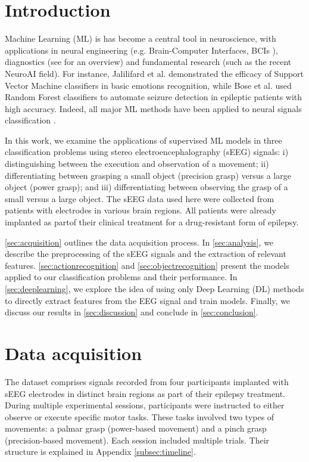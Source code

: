 \documentclass[10pt,conference,compsocconf]{IEEEtran}
\begin{document}
\section{Introduction}
Machine Learning (ML) is has become a central tool in neuroscience, with applications in neural engineering (e.g. Brain-Computer Interfaces, BCIs \cite{eegforbci}), diagnostics (see \cite{VIEIRA201758} for an overview) and fundamental research (such as the recent NeuroAI field). For instance, Jalilifard et al. \cite{EmotionClassificationSVM} demonstrated the efficacy of Support Vector Machine classifiers in basic emotions recognition, while Bose et al. \cite{EEGRandomForset} used Random Forest classifiers to automate seizure detection in epileptic patients with high accuracy. Indeed, all major ML methods have been applied to neural signals classification \cite{EEGMLReview}.

In this work, we examine the applications of supervised ML models in three classification problems using stereo electroencephalography (sEEG) signals: i) distinguishing between the execution and observation of a movement; ii) differentiating between grasping a small object (precision grasp) versus a large object (power grasp); and iii) differentiating between observing the grasp of a small versus a large object. The sEEG data used here were collected from patients with electrodes in various brain regions. All patients were already implanted as partof their clinical treatment for a drug-resistant form of epilepsy.

\autoref{sec:acquisition} outlines the data acquisition process. In \autoref{sec:analysis}, we describe the preprocessing of the sEEG signals and the extraction of relevant features. \autoref{sec:actionrecognition} and \autoref{sec:objectrecognition} present the models applied to our classification problems and their performance. In \autoref{sec:deeplearning}, we explore the idea of using only Deep Learning (DL) methods to directly extract features from the EEG signal and train models. Finally, we discuss our results in \autoref{sec:discussion} and conclude in \autoref{sec:conclusion}.

\section{Data acquisition}
\label{sec:acquisition}
The dataset comprises signals recorded from four participants implanted with sEEG electrodes in distinct brain regions as part of their epilepsy treatment. During multiple experimental sessions, participants were instructed to either observe or execute specific motor tasks. These tasks involved two types of movements: a palmar grasp (power-based movement) and a pinch grasp (precision-based movement). Each session included multiple trials. Their structure is explained in Appendix \ref{subsec:timeline}.
\end{document}
